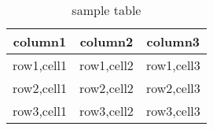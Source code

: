 \documentclass{article}
\begin{document}
	\begin{table}
		\centering
		\begin{tabular}{|c|c|c|}
			
			\hline
			column1 & column2 & column3\\
			\hline
			row1,cell1 & row1,cell2 & row1,cell3\\
			row2,cell1 & row2,cell2 & row2,cell3\\
			row3,cell1 & row3,cell2 & row3,cell3\\
			\hline
		\end{tabular}
		\caption{sample table}
		\label{fig:tab}
		
	\end{table}
\end{document}
